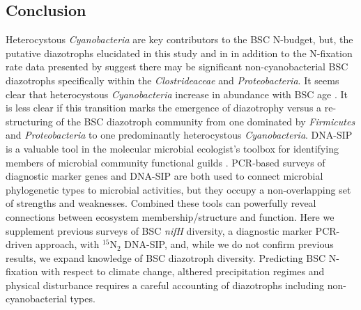 \subsection{Conclusion}
Heterocystous \textit{Cyanobacteria} are key contributors to the BSC
N-budget, but, the putative diazotrophs elucidated in this study and in
\citet{Steppe_1996} in addition to the N-fixation rate data presented by
\citep{15643930} suggest there may be significant
non-cyanobacterial BSC diazotrophs specifically within the
\textit{Clostrideaceae} and \textit{Proteobacteria}. It seems clear that
heterocystous \textit{Cyanobacteria} increase in abundance with BSC age
\citep{14766579}. It is less clear if this transition marks the emergence of
diazotrophy versus a re-structuring of the BSC diazotroph community from one
dominated by \textit{Firmicutes} and \textit{Proteobacteria} to one
predominantly heterocystous \textit{Cyanobacteria}. DNA-SIP is a valuable tool in the
molecular microbial ecologist's toolbox for identifying members of microbial
community functional guilds \citep{17446886}. PCR-based surveys of diagnostic
marker genes and DNA-SIP are both used to connect microbial phylogenetic
types to microbial activities, but they occupy a non-overlapping set of
strengths and weaknesses.  Combined these tools can powerfully reveal
connections between ecosystem membership/structure and function. Here we
supplement previous surveys of BSC \textit{nifH} diversity, a diagnostic
marker PCR-driven approach, with $^{15}$N$_{2}$ DNA-SIP, and, while we do not
confirm previous results, we expand knowledge of BSC diazotroph diversity.
Predicting BSC N-fixation with respect to climate change, althered 
precipitation regimes and physical disturbance requires a careful accounting of
diazotrophs including non-cyanobacterial types. 
